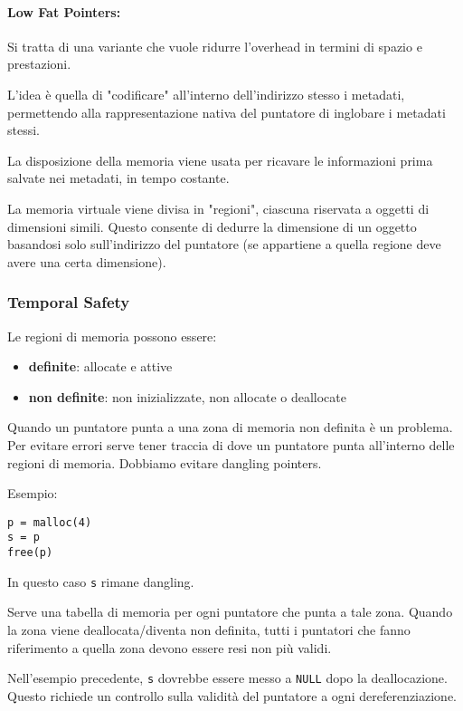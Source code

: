 \paragraph{Low Fat Pointers:} Si tratta di una variante che vuole ridurre l'overhead in termini di spazio e prestazioni. 

L'idea è quella di "codificare" all'interno dell'indirizzo stesso i metadati, permettendo alla rappresentazione nativa del puntatore di inglobare i metadati stessi. 

La disposizione della memoria viene usata per ricavare le informazioni prima salvate nei metadati, in tempo costante.

La memoria virtuale viene divisa in "regioni", ciascuna riservata a oggetti di dimensioni simili. Questo consente di dedurre la dimensione di un oggetto basandosi solo sull'indirizzo del puntatore (se appartiene a quella regione deve avere una certa dimensione).

\subsubsection{Temporal Safety}

Le regioni di memoria possono essere: 
\begin{itemize}
	\item \textbf{definite}: allocate e attive
    
	\item \textbf{non definite}: non inizializzate, non allocate o deallocate
\end{itemize}

Quando un puntatore punta a una zona di memoria non definita è un problema. Per evitare errori serve tener traccia di dove un puntatore punta all'interno delle regioni di memoria. Dobbiamo evitare dangling pointers.

Esempio: 
\begin{verbatim}
p = malloc(4)
s = p
free(p)
\end{verbatim}
In questo caso \texttt{s} rimane dangling.

Serve una tabella di memoria per ogni puntatore che punta a tale zona. Quando la zona viene deallocata/diventa non definita, tutti i puntatori che fanno riferimento a quella zona devono essere resi non più validi. 

Nell'esempio precedente, \texttt{s} dovrebbe essere messo a \texttt{NULL} dopo la deallocazione. Questo richiede un controllo sulla validità del puntatore a ogni dereferenziazione.

